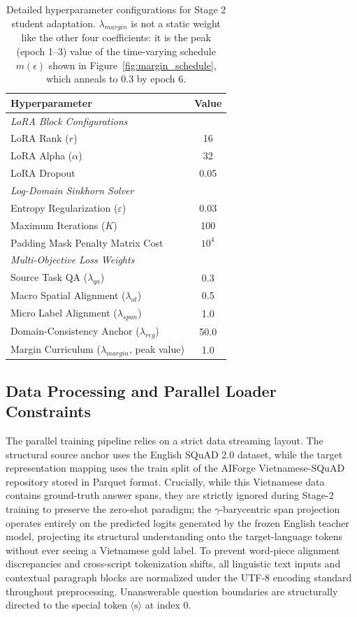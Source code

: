 \documentclass[11pt]{article}
\begin{document}
\begin{table}[H]
\centering
\small
\begin{tabular}{lc}
\toprule
\textbf{Hyperparameter} & \textbf{Value} \\
\midrule
\multicolumn{2}{l}{\textit{LoRA Block Configurations}} \\
LoRA Rank ($r$) & 16 \\
LoRA Alpha ($\alpha$) & 32 \\
LoRA Dropout & 0.05 \\
\midrule
\multicolumn{2}{l}{\textit{Log-Domain Sinkhorn Solver}} \\
Entropy Regularization ($\varepsilon$) & 0.03 \\
Maximum Iterations ($K$) & 100 \\
Padding Mask Penalty Matrix Cost & $10^4$ \\
\midrule
\multicolumn{2}{l}{\textit{Multi-Objective Loss Weights}} \\
Source Task QA ($\lambda_{qa}$) & 0.3 \\
Macro Spatial Alignment ($\lambda_{ot}$) & 0.5 \\
Micro Label Alignment ($\lambda_{span}$) & 1.0 \\
Domain-Consistency Anchor ($\lambda_{reg}$) & 50.0 \\
Margin Curriculum ($\lambda_{margin}$, peak value) & 1.0 \\
\bottomrule
\end{tabular}
\caption{Detailed hyperparameter configurations for Stage 2 student adaptation. $\lambda_{margin}$ is not a static weight like the other four coefficients: it is the peak (epoch 1--3) value of the time-varying schedule $m(\epsilon)$ shown in Figure~\ref{fig:margin_schedule}, which anneals to $0.3$ by epoch 6.}
\label{tab:hyperparameters}
\end{table}

\subsection{Data Processing and Parallel Loader Constraints}
The parallel training pipeline relies on a strict data streaming layout. The structural source anchor uses the English SQuAD 2.0 dataset, while the target representation mapping uses the train split of the AIForge Vietnamese-SQuAD repository stored in Parquet format. Crucially, while this Vietnamese data contains ground-truth answer spans, they are strictly ignored during Stage-2 training to preserve the zero-shot paradigm; the $\gamma$-barycentric span projection operates entirely on the predicted logits generated by the frozen English teacher model, projecting its structural understanding onto the target-language tokens without ever seeing a Vietnamese gold label. To prevent word-piece alignment discrepancies and cross-script tokenization shifts, all linguistic text inputs and contextual paragraph blocks are normalized under the UTF-8 encoding standard throughout preprocessing. Unanswerable question boundaries are structurally directed to the special token $\langle\text{s}\rangle$ at index 0.
\end{document}
